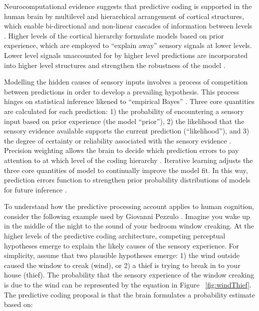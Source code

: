 \begin{CJK}{UTF8}{gbsn}
Neurocomputational evidence suggests that predictive coding is supported in the human brain by multilevel and hierarchical arrangement of cortical structures, which enable bi-directional and non-linear cascades of information between levels \citep{Feldman2010}.  Higher levels of the cortical hierarchy formulate models based on prior experience, which are employed to ``explain away'' sensory signals at lower levels.  Lower level signals unaccounted for by higher level predictions are incorporated into higher level structures and strengthen the robustness of the model \citep{Clark2013}.

Modelling the hidden causes of sensory inputs involves a process of competition between predictions in order to develop a prevailing hypothesis. This process hinges on statistical inference likened to ``empirical Bayes'' \citep{Clark2013}.  Three core quantities are calculated for each prediction: 1) the probability of encountering a sensory input based on prior experience (the model ``prior''), 2) the likelihood that the sensory evidence available supports the current prediction (``likelihood''), and 3) the degree of certainty or reliability associated with the sensory evidence \citep[which is proportional to the inverse variance of the model prior for each sensory input][]{Ernst2004,Clark2013,FitzGerald2014}. Precision weighting allows the brain to decide which prediction errors to pay attention to at which level of the coding hierarchy \citep[be it high and conceptual or deep and sensory][]{Friston2015}.  Iterative learning adjusts the three core quantities of model to continually improve the model fit.  In this way, prediction errors function to strengthen prior probability distributions of models for future inference \citep{Robbins1964}.

To understand how the predictive processing account applies to human cognition, consider the following example used by Giovanni Pezzulo \textcite{Pezzulo2013}.  Imagine you wake up in the middle of the night to the sound of your bedroom window creaking.  At the higher levels of the predictive coding architecture, competing perceptual hypotheses emerge to explain the likely causes of the sensory experience.  For simplicity, assume that two plausible hypotheses emerge: 1) the wind outside caused the window to creak (wind), or 2) a thief is trying to break in to your house (thief).  The probability that the sensory experience of the window creaking is due to the wind can be represented by the equation in Figure ~\ref{fig:windThief}.  The predictive coding proposal is that the brain formulates a probability estimate based on:


\end{CJK}
